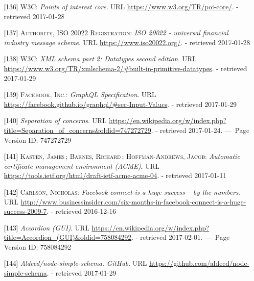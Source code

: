 \documentclass[12pt,english,a4paper,titlepage,cleardoublepage=empty,dottedtoc]{report}
\begin{document}
\hypertarget{ref-web_spec_data-schemas_poi}{}
{[}136{]} \textsc{W3C}: \emph{Points of interest core}. URL
\url{https://www.w3.org/TR/poi-core/}. - retrieved 2017-01-28

\hypertarget{ref-web_spec_data-schemas_bank-transfer}{}
{[}137{]} \textsc{Authority, ISO 20022 Registration}: \emph{ISO 20022 -
universal financial industry message scheme}. URL
\url{https://www.iso20022.org/}. - retrieved 2017-01-28

\hypertarget{ref-web_spec_xml_types}{}
{[}138{]} \textsc{W3C}: \emph{XML schema part 2: Datatypes second
edition}. URL
\url{https://www.w3.org/TR/xmlschema-2/\#built-in-primitive-datatypes}.
- retrieved 2017-01-29

\hypertarget{ref-web_spec_graphql_types}{}
{[}139{]} \textsc{Facebook, Inc.}: \emph{GraphQL Specification}. URL
\url{https://facebook.github.io/graphql/\#sec-Input-Values}. - retrieved
2017-01-29

\hypertarget{ref-web_2016_wikipedia_separation-of-concerns}{}
{[}140{]} \emph{Separation of concerns}. URL
\url{https://en.wikipedia.org/w/index.php?title=Separation_of_concerns\&oldid=747272729}.
- retrieved 2017-01-24. ---~Page Version ID: 747272729

\hypertarget{ref-web_spec_acme}{}
{[}141{]} \textsc{Kasten, James}\,; \textsc{Barnes, Richard}\,;
\textsc{Hoffman-Andrews, Jacob}: \emph{Automatic certificate management
environment (ACME)}. URL
\url{https://tools.ietf.org/html/draft-ietf-acme-acme-04}. - retrieved
2017-01-11

\hypertarget{ref-web_2009-success-of-facebook-connect}{}
{[}142{]} \textsc{Carlson, Nicholas}: \emph{Facebook connect is a huge
success -- by the numbers}. URL
\url{http://www.businessinsider.com/six-months-in-facebook-connect-is-a-huge-success-2009-7}.
- retrieved 2016-12-16

\hypertarget{ref-web_2016_wikipedia_accordion-gui}{}
{[}143{]} \emph{Accordion (GUI)}. URL
\url{https://en.wikipedia.org/w/index.php?title=Accordion_(GUI)\&oldid=758084292}.
- retrieved 2017-02-01. ---~Page Version ID: 758084292

\hypertarget{ref-web_2017_repo_node-simple-schema}{}
{[}144{]} \emph{Aldeed/node-simple-schema. GitHub}. URL
\url{https://github.com/aldeed/node-simple-schema}. - retrieved
2017-01-29
\end{document}
